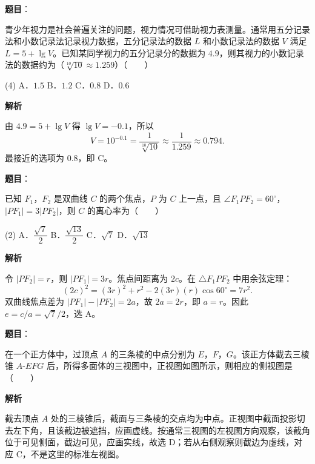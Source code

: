 \begin{answer}

\textbf{题目}：

青少年视力是社会普遍关注的问题，视力情况可借助视力表测量。通常用五分记录法和小数记录法记录视力数据，五分记录法的数据 $L$ 和小数记录法的数据 $V$ 满足 $L=5+\lg V$。已知某同学视力的五分记录分的数据为 $4.9$，则其视力的小数记录法的数据约为（$\sqrt[10]{10}\approx1.259$）\mbox{（　　）}

\begin{gkopts}(4)
\task A．$1.5$
\task B．$1.2$
\task C．$0.8$
\task D．$0.6$
\end{gkopts}

\textbf{解析}

由 $4.9=5+\lg V$ 得 $\lg V=-0.1$，所以
\nopagebreak[4]
\[
V=10^{-0.1}=\frac1{\sqrt[10]{10}}\approx\frac1{1.259}\approx0.794.
\]
最接近的选项为 $0.8$，即 C。


\end{answer}
\begin{answer}

\textbf{题目}：

已知 $F_1$，$F_2$ 是双曲线 $C$ 的两个焦点，$P$ 为 $C$ 上一点，且 $\angle F_1PF_2=60^\circ$，$|PF_1|=3|PF_2|$，则 $C$ 的离心率为\mbox{（　　）}

\begin{gkopts}(2)
\task A．$\dfrac{\sqrt7}{2}$
\task B．$\dfrac{\sqrt{13}}2$
\task C．$\sqrt7$
\task D．$\sqrt{13}$
\end{gkopts}

\textbf{解析}

令 $|PF_2|=r$，则 $|PF_1|=3r$。焦点间距离为 $2c$。在 $\triangle F_1PF_2$ 中用余弦定理：
\nopagebreak[4]
\[
(2c)^2=(3r)^2+r^2-2(3r)(r)\cos60^\circ=7r^2.
\]
双曲线焦点差为 $|PF_1|-|PF_2|=2a$，故 $2a=2r$，即 $a=r$。因此 $e=c/a=\sqrt7/2$，选 A。


\end{answer}
\begin{answer}

\textbf{题目}：

在一个正方体中，过顶点 $A$ 的三条棱的中点分别为 $E$，$F$，$G$。该正方体截去三棱锥 $A\text{-}EFG$ 后，所得多面体的三视图中，正视图如图所示，则相应的侧视图是\mbox{（　　）}
\nopagebreak[4]
\begin{center}\end{center}
\nopagebreak[4]
\textbf{解析}

截去顶点 $A$ 处的三棱锥后，截面与三条棱的交点均为中点。正视图中截面投影切去左下角，且该截边被遮挡，应画虚线。按通常三视图的左视图方向观察，该截角位于可见侧面，截边可见，应画实线，故选 D；若从右侧观察则截边为虚线，对应 C，不是这里的标准左视图。


\end{answer}
